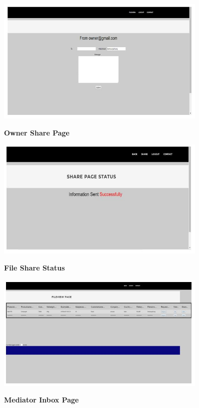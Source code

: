 \documentclass[BTech]{srmuthesis}
\begin{document}
\begin{figure}[H]
\centering
\includegraphics[width=0.9\textwidth]{ownersharepage.jpg}
\label{Figure:10} \hspace{10mm}
\caption{\textbf{Owner Share Page}}
\end{figure}

\begin{figure}[H]
\centering
\includegraphics[width=0.9\textwidth]{filesharestatus.jpg}
\label{Figure:10} \hspace{10mm}
\caption{\textbf{File Share Status}}
\end{figure}

\begin{figure}[H]
\centering
\includegraphics[width=0.9\textwidth]{mediatorinboxpage.jpg}
\label{Figure:10} \hspace{10mm}
\caption{\textbf{Mediator Inbox Page}}
\end{figure}
\end{document}
